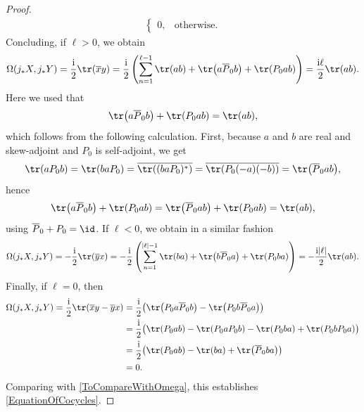 \begin{proof}
\begin{align*}
\begin{cases}
 0, & \text{otherwise}.
 \end{cases}	
\end{align*}
Concluding, if $\ell >0$, we obtain
\begin{equation*}
 \Omega(j_*X, j_*Y) = \frac{{\rm i}}{2} \tr(\overline{x}y) = \frac{{\rm i}}{2} \left(\sum_{n=1}^{\ell-1}\tr(ab) + \tr\big(a\overline{P}_0 b\big) + \tr(P_0ab) \right) = \frac{{\rm i}\ell}{2}\tr(ab).
\end{equation*}
Here we used that
\[\tr\big(a\overline{P}_0 b\big) + \tr(P_0ab) = \tr(ab),\] which follows from the following calculation.
First, because $a$ and $b$ are real and skew-adjoint and $P_0$ is self-adjoint, we get
\begin{equation*}
 	\tr(aP_0b) = \tr(baP_0) = \overline{\tr((baP_0)^*)} = \overline{\tr(P_0 (-a)(-b))} = \tr\big(\overline{P}_0ab\big),
\end{equation*}
hence
\begin{equation*}
	\tr\big(a\overline{P}_0 b\big) + \tr(P_0ab) = \tr\big(\overline{P}_0 ab\big) + \tr(P_0ab) = \tr(ab),
\end{equation*}
using $\overline{P}_0 + P_0 = \id$.
If $\ell < 0$, we obtain in a similar fashion
\begin{equation*}
 \Omega(j_*X, j_*Y) = -\frac{{\rm i}}{2} \tr(\overline{y}x) = -\frac{{\rm i}}{2} \left(\sum_{n=1}^{|\ell|-1}\tr(ba) + \tr\big(b\overline{P}_0 a\big) + \tr(P_0ba) \right) = -\frac{{\rm i}|\ell|}{2}\tr(ab).
\end{equation*}
Finally, if $\ell=0$, then
\begin{equation*}
\begin{aligned}
 	\Omega(j_*X, j_*Y) = \frac{{\rm i}}{2} \tr(\overline{x}y - \overline{y}x)
 	&= \frac{{\rm i}}{2} \big(\tr\big(P_0 a\overline{P}_0b\big) - \tr\big(P_0 b\overline{P}_0a\big)\big)\\
 	&= \frac{{\rm i}}{2} \big(\tr(P_0 ab) - \tr(P_0 a{P}_0b) - \tr(P_0 ba) + \tr(P_0 bP_0a)\big) \\
 	&=\frac{{\rm i}}{2} \big(\tr(P_0 ab) - \tr(ba) + \tr\big(\overline{P}_0 ba\big) \big) \\
 	& = 0.
\end{aligned}
\end{equation*}
Comparing with \eqref{ToCompareWithOmega}, this establishes \eqref{EquationOfCocycles}.
\end{proof}
